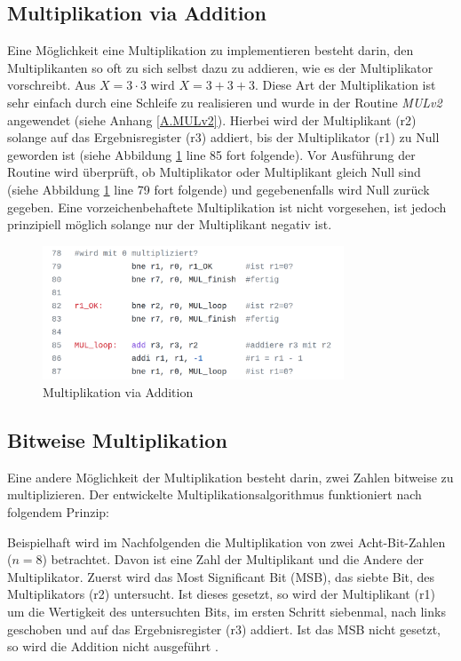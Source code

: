 \documentclass[fleqn, a4paper, 11pt]{article}       %
\begin{document}
\subsection{Multiplikation via Addition}
Eine Möglichkeit eine Multiplikation zu implementieren besteht darin, den Multiplikanten so oft zu sich selbst dazu zu addieren, wie es der Multiplikator vorschreibt. Aus $X = 3 \cdot 3$ wird  $X = 3+3+3$. Diese Art der Multiplikation ist sehr einfach durch eine Schleife zu realisieren und wurde in der Routine \emph{MULv2} angewendet (siehe Anhang \ref{A.MULv2}). Hierbei wird der Multiplikant (r2) solange auf das Ergebnisregister (r3) addiert, bis der Multiplikator (r1) zu Null geworden ist (siehe Abbildung \ref{fig:MULv2_code} line 85 fort folgende). Vor Ausführung der Routine wird überprüft, ob Multiplikator oder Multiplikant gleich Null sind (siehe Abbildung \ref{fig:MULv2_code} line 79 fort folgende) und gegebenenfalls wird Null zurück gegeben. Eine vorzeichenbehaftete Multiplikation ist nicht vorgesehen, ist jedoch prinzipiell möglich solange nur der Multiplikant negativ ist.

\begin{figure}[h]
    \includegraphics[width =0.8\textwidth]{MULv2_code.png}
\caption{Multiplikation via Addition}
\label{fig:MULv2_code}
\end{figure}

\subsection{Bitweise Multiplikation}
Eine andere Möglichkeit der Multiplikation besteht darin, zwei Zahlen bitweise zu multiplizieren. Der entwickelte Multiplikationsalgorithmus funktioniert nach folgendem Prinzip: 

Beispielhaft wird im Nachfolgenden die Multiplikation von zwei Acht-Bit-Zahlen \\ ($n = 8$) betrachtet. Davon ist eine Zahl der Multiplikant und die Andere der Multiplikator. Zuerst wird das Most Significant Bit (MSB), das siebte Bit, des Multiplikators (r2) untersucht. Ist dieses gesetzt, so wird der Multiplikant (r1) um die Wertigkeit des untersuchten Bits, im ersten Schritt siebenmal, nach links geschoben und auf das Ergebnisregister (r3) addiert. Ist das MSB nicht gesetzt, so wird die Addition nicht ausgeführt \cite{MULv3}. \\
\end{document}

